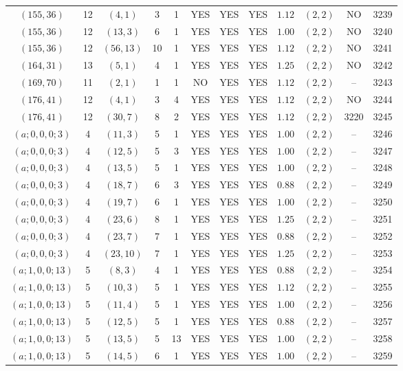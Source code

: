 \begin{longtable}{|c|c|c|c|c|c|c|c|c|c|c|c|}
$(155,36)$ & 12 & $(4,1)$ & 3 & 1 & YES & YES & YES & $1.12$ & $(2,2)$ & NO & 3239\\
$(155,36)$ & 12 & $(13,3)$ & 6 & 1 & YES & YES & YES & $1.00$ & $(2,2)$ & NO & 3240\\
$(155,36)$ & 12 & $(56,13)$ & 10 & 1 & YES & YES & YES & $1.12$ & $(2,2)$ & NO & 3241\\
$(164,31)$ & 13 & $(5,1)$ & 4 & 1 & YES & YES & YES & $1.25$ & $(2,2)$ & NO & 3242\\
$(169,70)$ & 11 & $(2,1)$ & 1 & 1 & NO & YES & YES & $1.12$ & $(2,2)$ & -- & 3243\\
$(176,41)$ & 12 & $(4,1)$ & 3 & 4 & YES & YES & YES & $1.12$ & $(2,2)$ & NO & 3244\\
$(176,41)$ & 12 & $(30,7)$ & 8 & 2 & YES & YES & YES & $1.12$ & $(2,2)$ & 3220 & 3245\\
$(a;0,0,0;3)$ & 4 & $(11,3)$ & 5 & 1 & YES & YES & YES & $1.00$ & $(2,2)$ & -- & 3246\\
$(a;0,0,0;3)$ & 4 & $(12,5)$ & 5 & 3 & YES & YES & YES & $1.00$ & $(2,2)$ & -- & 3247\\
$(a;0,0,0;3)$ & 4 & $(13,5)$ & 5 & 1 & YES & YES & YES & $1.00$ & $(2,2)$ & -- & 3248\\
$(a;0,0,0;3)$ & 4 & $(18,7)$ & 6 & 3 & YES & YES & YES & $0.88$ & $(2,2)$ & -- & 3249\\
$(a;0,0,0;3)$ & 4 & $(19,7)$ & 6 & 1 & YES & YES & YES & $1.00$ & $(2,2)$ & -- & 3250\\
$(a;0,0,0;3)$ & 4 & $(23,6)$ & 8 & 1 & YES & YES & YES & $1.25$ & $(2,2)$ & -- & 3251\\
$(a;0,0,0;3)$ & 4 & $(23,7)$ & 7 & 1 & YES & YES & YES & $0.88$ & $(2,2)$ & -- & 3252\\
$(a;0,0,0;3)$ & 4 & $(23,10)$ & 7 & 1 & YES & YES & YES & $1.25$ & $(2,2)$ & -- & 3253\\
$(a;1,0,0;13)$ & 5 & $(8,3)$ & 4 & 1 & YES & YES & YES & $0.88$ & $(2,2)$ & -- & 3254\\
$(a;1,0,0;13)$ & 5 & $(10,3)$ & 5 & 1 & YES & YES & YES & $1.12$ & $(2,2)$ & -- & 3255\\
$(a;1,0,0;13)$ & 5 & $(11,4)$ & 5 & 1 & YES & YES & YES & $1.00$ & $(2,2)$ & -- & 3256\\
$(a;1,0,0;13)$ & 5 & $(12,5)$ & 5 & 1 & YES & YES & YES & $0.88$ & $(2,2)$ & -- & 3257\\
$(a;1,0,0;13)$ & 5 & $(13,5)$ & 5 & 13 & YES & YES & YES & $1.00$ & $(2,2)$ & -- & 3258\\
$(a;1,0,0;13)$ & 5 & $(14,5)$ & 6 & 1 & YES & YES & YES & $1.00$ & $(2,2)$ & -- & 3259\\

\end{longtable}
